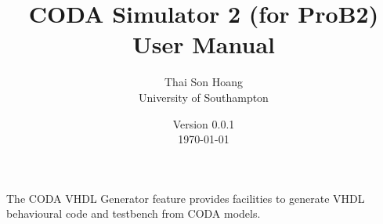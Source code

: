 \documentclass[a4paper,10pt]{article}
\title{CODA Simulator 2 (for ProB2) User Manual}
\author{Thai Son Hoang \\ University of Southampton}
\date{%
  Version 0.0.1\\%
  \today%
}
\begin{document}
\ifplastex%
\maketitle%
\else%
 \ifstandalone%
 \maketitle %
 \else%
 \fi%
\fi%

The CODA VHDL Generator feature provides facilities to generate VHDL behavioural code and testbench from CODA models. 












\end{document}
